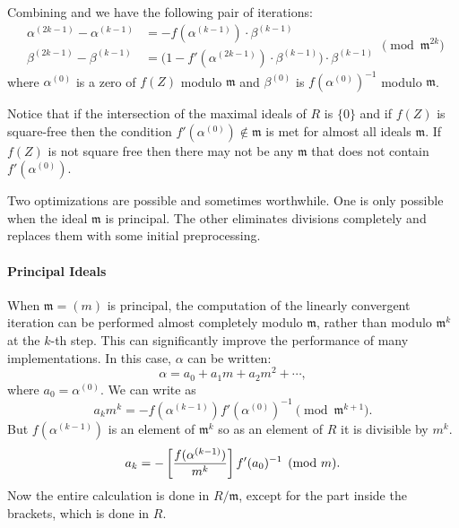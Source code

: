 {Combining  and  we have the
following pair of iterations: 
\begin{equation}
\label{Quasi:UNewton:Eq}
\begin{aligned}
  \alpha^{(2k-1)} - \alpha^{(k-1)} &= - f(\alpha^{(k-1)}) \cdot
    \beta^{(k-1)} \\
  \beta^{(2k-1)} - \beta^{(k-1)} & 
     = \bigl(1 - f'(\alpha^{(2k-1)}) \cdot \beta^{(k-1)}\bigr) \cdot
       \beta^{(k-1)}
\end{aligned}
\pmod{\mathfrak{m}^{2k}}
\end{equation}
where $\alpha^{(0)}$ is a zero of $f(Z)$ modulo $\mathfrak{m}$ and
$\beta^{(0)}$ is $f(\alpha^{(0)})^{-1}$ modulo $\mathfrak{m}$.  

Notice that if the intersection of the maximal ideals of $R$ is
$\{0\}$ and if $f(Z)$ is square-free then the condition
$f'(\alpha^{(0)}) \not\in \mathfrak{m}$ is met for almost all ideals
$\mathfrak{m}$.  If $f(Z)$ is not square free then there may not be any
$\mathfrak{m}$ that does not contain $f'(\alpha^{(0)})$.

\medskip
Two optimizations are possible and sometimes worthwhile.  One is only
possible when the ideal $\mathfrak{m}$ is principal.  The other
eliminates divisions completely and replaces them with some initial
preprocessing.

\paragraph{Principal Ideals}

When $\mathfrak{m} = (m)$ is principal, the computation of the
linearly convergent iteration can be performed almost completely
modulo $\mathfrak{m}$, rather than modulo $\mathfrak{m}^{k}$ at the
$k$-th step.  This can significantly improve the performance of many
implementations.  In this case, $\alpha$ can be written:
\[
\alpha = a_0 + a_1 m + a_2 m^2 + \cdots,
\]
where $a_0 = \alpha^{(0)}$.  We can write  as
\[
a_k m^k = -f(\alpha^{(k-1)}) f'(\alpha^{(0)})^{-1} \pmod{\mathfrak{m}^{k+1}}.
\]
But $f(\alpha^{(k-1)})$ is an element of $\mathfrak{m}^k$ so as an element of
$R$ it is divisible by $m^k$.
\begin{equation}
a_k = - \left[{ f(\alpha^{(k-1)}) \over m^k}\right]
f'(a_0)^{-1} \pmod{m}.
\label{EQ:5}
\end{equation}
Now the entire calculation is done in $R/\mathfrak{m}$, except for the part
inside the brackets, which is done in $R$.

}
